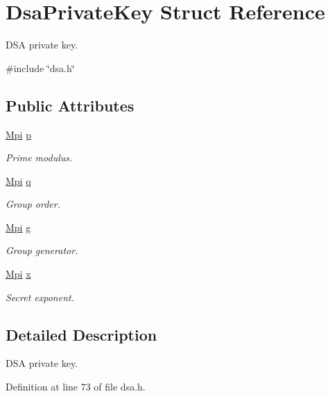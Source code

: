 \hypertarget{structDsaPrivateKey}{}\section{Dsa\+Private\+Key Struct Reference}
\label{structDsaPrivateKey}


D\+SA private key.  




{\ttfamily \#include \char`\"{}dsa.\+h\char`\"{}}

\subsection*{Public Attributes}
\begin{DoxyCompactItemize}
\item 
\hyperlink{structMpi}{Mpi} \hyperlink{structDsaPrivateKey_a8f8fd999b327a6bbff828cb04e31772e}{p}
\begin{DoxyCompactList}\small\item\em Prime modulus. \end{DoxyCompactList}\item 
\hyperlink{structMpi}{Mpi} \hyperlink{structDsaPrivateKey_a57748f022f498aaf35d7b30f562af7ca}{q}
\begin{DoxyCompactList}\small\item\em Group order. \end{DoxyCompactList}\item 
\hyperlink{structMpi}{Mpi} \hyperlink{structDsaPrivateKey_a78da170adbc7f1a7eeb95e6bc52d4124}{g}
\begin{DoxyCompactList}\small\item\em Group generator. \end{DoxyCompactList}\item 
\hyperlink{structMpi}{Mpi} \hyperlink{structDsaPrivateKey_ac5b101c89f19f59b4cddd85429f1c30e}{x}
\begin{DoxyCompactList}\small\item\em Secret exponent. \end{DoxyCompactList}\end{DoxyCompactItemize}


\subsection{Detailed Description}
D\+SA private key. 

Definition at line 73 of file dsa.\+h.



